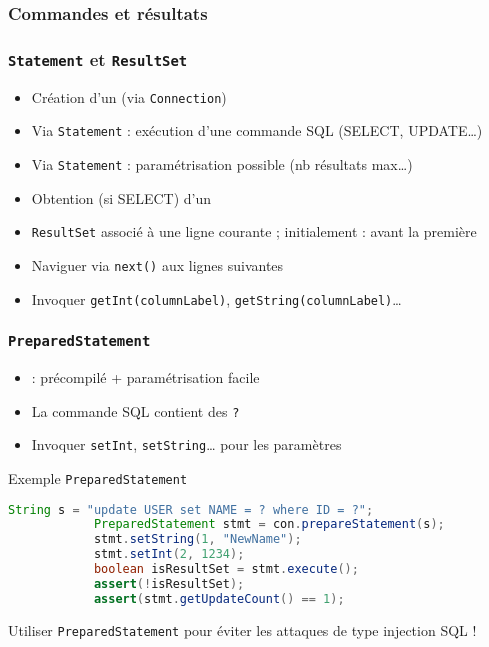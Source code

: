 \documentclass[english, french]{beamer}
\begin{document}
\subsubsection{Commandes et résultats}
\begin{frame}
	\frametitle{\texttt{Statement} et \texttt{ResultSet}}
	\begin{itemize}
		\item Création d’un  (via \texttt{Connection})
		\item Via \texttt{Statement} : exécution d’une commande SQL (SELECT, UPDATE…)
		\item Via \texttt{Statement} : paramétrisation possible (nb résultats max…)
		\item Obtention (si SELECT) d’un 
		\item \texttt{ResultSet} associé à une ligne courante ; initialement : avant la première
		\item Naviguer via \texttt{next()} aux lignes suivantes
		\item Invoquer \texttt{getInt(columnLabel)}, \texttt{getString(columnLabel)}…
	\end{itemize}
\end{frame}

\begin{frame}[fragile]
	\frametitle{\texttt{PreparedStatement}}
	\begin{itemize}
		\item {} : précompilé + paramétrisation facile
		\item La commande SQL contient des \texttt{?}
		\item Invoquer \texttt{setInt}, \texttt{setString}… pour les paramètres
	\end{itemize}
	\begin{exampleblock}{Exemple \texttt{PreparedStatement}}
		\begin{lstlisting}[keywordstyle=\fontspec{Latin Modern Mono Light}\textbf, emph={String, PreparedStatement}, emphstyle=\fontspec{Latin Modern Mono Light}\textbf, language=Java, basicstyle=\small\NoAutoSpacing\ttfamily, aboveskip=0pt, belowskip=0pt, showstringspaces=false]
			String s = "update USER set NAME = ? where ID = ?";
			PreparedStatement stmt = con.prepareStatement(s);
			stmt.setString(1, "NewName");
			stmt.setInt(2, 1234);
			boolean isResultSet = stmt.execute();
			assert(!isResultSet);
			assert(stmt.getUpdateCount() == 1);
		\end{lstlisting}
	\end{exampleblock}
	Utiliser \texttt{PreparedStatement} pour éviter les attaques de type injection SQL !
\end{frame}
\end{document}
